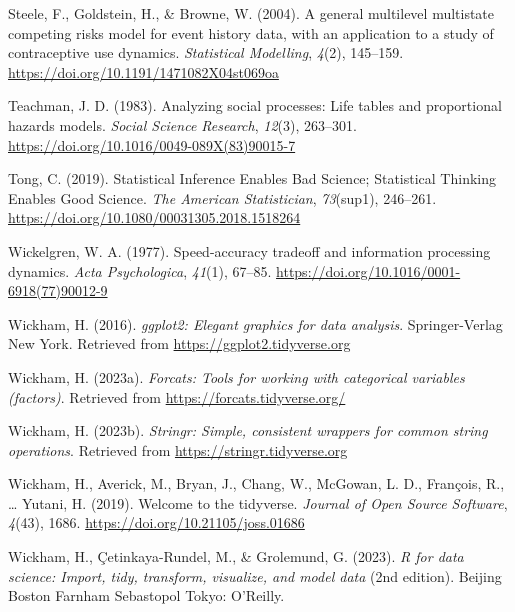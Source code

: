 \documentclass[
  man, donotrepeattitle,floatsintext]{apa6}
\newlength{\cslhangindent}
\newenvironment{CSLReferences}[2] %
 {\begin{list}{}{%
  \setlength{\itemindent}{0pt}
  \setlength{\leftmargin}{0pt}
  \setlength{\parsep}{0pt}
  \ifodd #1
   \setlength{\leftmargin}{\cslhangindent}
   \setlength{\itemindent}{-1\cslhangindent}
  \fi
  \setlength{\itemsep}{#2\baselineskip}}}
 {\end{list}}
\begin{document}
\begin{CSLReferences}{1}{0}
Steele, F., Goldstein, H., \& Browne, W. (2004). A general multilevel multistate competing risks model for event history data, with an application to a study of contraceptive use dynamics. \emph{Statistical Modelling}, \emph{4}(2), 145--159. \url{https://doi.org/10.1191/1471082X04st069oa}

Teachman, J. D. (1983). Analyzing social processes: {Life} tables and proportional hazards models. \emph{Social Science Research}, \emph{12}(3), 263--301. \url{https://doi.org/10.1016/0049-089X(83)90015-7}

Tong, C. (2019). Statistical {Inference Enables Bad Science}; {Statistical Thinking Enables Good Science}. \emph{The American Statistician}, \emph{73}(sup1), 246--261. \url{https://doi.org/10.1080/00031305.2018.1518264}

Wickelgren, W. A. (1977). Speed-accuracy tradeoff and information processing dynamics. \emph{Acta Psychologica}, \emph{41}(1), 67--85. \url{https://doi.org/10.1016/0001-6918(77)90012-9}

Wickham, H. (2016). \emph{ggplot2: Elegant graphics for data analysis}. Springer-Verlag New York. Retrieved from \url{https://ggplot2.tidyverse.org}

Wickham, H. (2023a). \emph{Forcats: Tools for working with categorical variables (factors)}. Retrieved from \url{https://forcats.tidyverse.org/}

Wickham, H. (2023b). \emph{Stringr: Simple, consistent wrappers for common string operations}. Retrieved from \url{https://stringr.tidyverse.org}

Wickham, H., Averick, M., Bryan, J., Chang, W., McGowan, L. D., François, R., \ldots{} Yutani, H. (2019). Welcome to the {tidyverse}. \emph{Journal of Open Source Software}, \emph{4}(43), 1686. \url{https://doi.org/10.21105/joss.01686}

Wickham, H., Çetinkaya-Rundel, M., \& Grolemund, G. (2023). \emph{R for data science: Import, tidy, transform, visualize, and model data} (2nd edition). Beijing Boston Farnham Sebastopol Tokyo: O'Reilly.


\end{CSLReferences}
\end{document}
